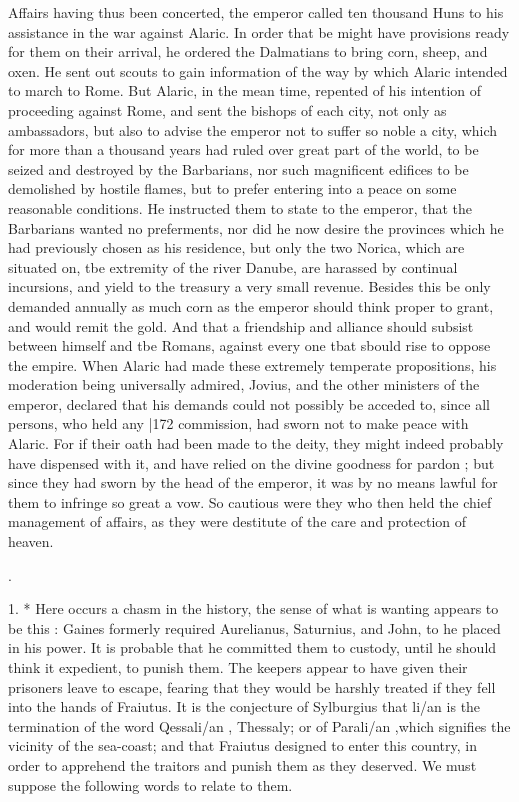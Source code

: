 Affairs having thus been concerted, the emperor called ten thousand Huns to his assistance in the war against Alaric. In order that be might have provisions ready for them on their arrival, he ordered the Dalmatians to bring corn, sheep, and oxen. He sent out scouts to gain information of the way by which Alaric intended to march to Rome. But Alaric, in the mean time, repented of his intention of proceeding against Rome, and sent the bishops of each city, not only as ambassadors, but also to advise the emperor not to suffer so noble a city, which for more than a thousand years had ruled over great part of the world, to be seized and destroyed by the Barbarians, nor such magnificent edifices to be demolished by hostile flames, but to prefer entering into a peace on some reasonable conditions. He instructed them to state to the emperor, that the Barbarians wanted no preferments, nor did he now desire the provinces which he had previously chosen as his residence, but only the two Norica, which are situated on, tbe extremity of the river Danube, are harassed by continual incursions, and yield to the treasury a very small revenue. Besides this be only demanded annually as much corn as the emperor should think proper to grant, and would remit the gold. And that a friendship and alliance should subsist between himself and tbe Romans, against every one tbat sbould rise to oppose
the empire. When Alaric had made these extremely temperate propositions, his moderation being universally admired, Jovius, and the
other ministers of the emperor, declared that his demands could not possibly be acceded to, since all persons, who held any
|172 commission, had sworn not to make peace with Alaric. For if their oath had been made to the deity, they might indeed probably have dispensed with it, and have relied on the divine goodness for pardon ; but since they had sworn by the head of the emperor, it was by no means lawful for them to infringe so great a vow. So cautious were they who then held the chief management of affairs, as they were destitute of the care and protection of heaven.

.

1. * Here occurs a chasm in the history, the sense of what is wanting appears to be this : Gaines formerly required Aurelianus, Saturnius, and John, to he placed in his power. It is probable that he committed them to custody,
until he should think it expedient, to punish them. The keepers appear to have given their prisoners leave to escape, fearing that they would be harshly treated if they fell into the hands of Fraiutus. It is the conjecture of Sylburgius that
li/an is the termination of the word Qessali/an , Thessaly; or of
Parali/an ,\emph{}which signifies the vicinity of the sea-coast; and that Fraiutus designed to enter this country, in order to apprehend the traitors and punish them as they deserved. We must suppose the following words
to relate to them.


